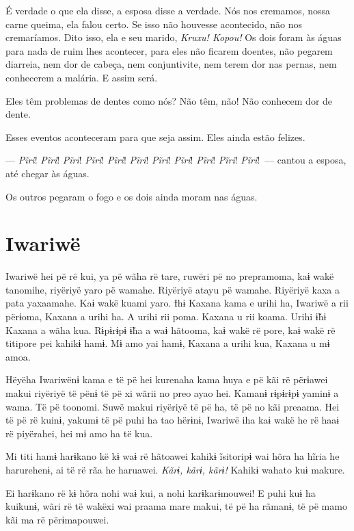 É verdade o que ela disse, a esposa disse a verdade. Nós nos cremamos,
nossa carne queima, ela falou certo. Se isso não houvesse acontecido,
não nos cremaríamos. Dito isso, ela e seu marido, \textit{Kruxu! Kopou!} Os dois
foram às águas para nada de ruim lhes acontecer, para eles não ficarem
doentes, não pegarem diarreia, nem dor de cabeça, nem conjuntivite, nem
terem dor nas pernas, nem conhecerem a malária. E assim será. 

Eles têm problemas de dentes como nós? Não têm, não! Não conhecem dor de
dente. 

Esses eventos aconteceram para que seja assim. Eles ainda estão
felizes. 

--- \textit{Pĩri}! \textit{Pĩri}! \textit{Pĩri}! \textit{Pĩri}! \textit{Pĩri}! \textit{Pĩri}! \textit{Pĩri}! \textit{Pĩri}! \textit{Pĩri}! \textit{Pĩri}! \textit{Pĩri}!~--- cantou a esposa, até chegar às águas. 

Os outros pegaram o fogo e os dois ainda moram nas águas.

\chapter{Iwariwë}

 Iwariwë hei pë rë kui, ya pë wãha rë tare, ruwëri pë no prepramoma,
kaɨ wakë tanomihe, riyëriyë yaro pë wamahe. Riyëriyë atayu pë wamahe.
Riyëriyë kaxa a pata yaxaamahe. Kaɨ wakë kuami yaro. Ɨhɨ Kaxana kama e
urihi ha, Iwariwë a rii përɨoma, Kaxana a urihi ha. A urihi rii poma.
Kaxana u rii koama. Urihi ɨ̃hɨ Kaxana a wãha kua. Rɨpɨrɨpɨ ɨ̃ha a waɨ
hãtooma, kaɨ wakë rë pore, kaɨ wakë rë titipore pei kahikɨ hamɨ. Mɨ amo
yai hamɨ, Kaxana a urihi kua, Kaxana u mɨ amoa. 

Hëyëha Iwariwënɨ kama e të pë hei kurenaha kama huya e pë kãi rë
përɨawei makui riyëriyë të pënɨ të pë xi wãrii no preo ayao hei. Kamanɨ
rɨpɨrɨpɨ yaminɨ a wama. Të pë toonomi. Suwë makui riyëriyë të pë ha, të
pë no kãi preaama. Hei të pë rë kuinɨ, yakumɨ të pë puhi ha tao hërɨnɨ,
Iwariwë iha kaɨ wakë he rë haaɨ rë piyërahei, hei mɨ amo ha të kua. 

Mi titi hamɨ harɨkano kë kɨ waɨ rë hãtoawei kahikɨ ĩsitoripɨ wai hõra ha
hĩria he harurehenɨ, ai të rë rãa he haruawei. \textit{Kãrɨ, kãrɨ, kãrɨ!} Kahikɨ
wahato kuɨ makure. 

Ei harɨkano rë kɨ hõra nohi waɨ kui, a nohi karɨkarɨmouwei! E puhi kuɨ
ha kuikunɨ, wãri rë të wakëxi wai praama mare makui, të pë ha rãmanɨ, të
pë mamo kãi ma rë përɨmapouwei. 

